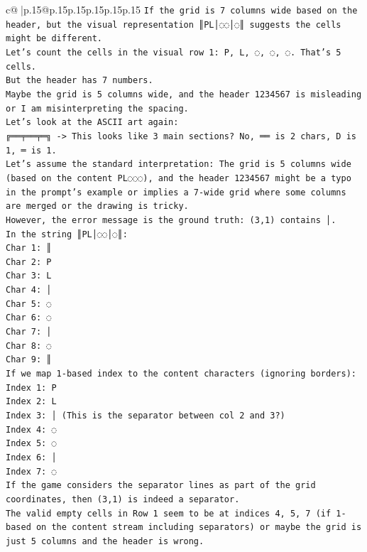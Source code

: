 \documentclass{article}
\begin{document}
{\begin{supertabular}{c@{$\;$}|p{.15\linewidth}@{}p{.15\linewidth}p{.15\linewidth}p{.15\linewidth}p{.15\linewidth}p{.15\linewidth}}
{{{\texttt{If the grid is 7 columns wide based on the header, but the visual representation ║PL│◌◌│◌║ suggests the cells might be different.} \\
\texttt{Let's count the cells in the visual row 1: P, L, ◌, ◌, ◌. That's 5 cells.} \\
\texttt{But the header has 7 numbers.} \\
\texttt{Maybe the grid is 5 columns wide, and the header 1234567 is misleading or I am misinterpreting the spacing.} \\
\texttt{Let's look at the ASCII art again:} \\
\texttt{╔══╤══╤═╗ {-}> This looks like 3 main sections? No, ══ is 2 chars, D is 1, ═ is 1.} \\
\texttt{Let's assume the standard interpretation: The grid is 5 columns wide (based on the content PL◌◌◌), and the header 1234567 might be a typo in the prompt's example or implies a 7{-}wide grid where some columns are merged or the drawing is tricky.} \\
\texttt{However, the error message is the ground truth: (3,1) contains │.} \\
\texttt{In the string ║PL│◌◌│◌║:} \\
\texttt{Char 1: ║} \\
\texttt{Char 2: P} \\
\texttt{Char 3: L} \\
\texttt{Char 4: │} \\
\texttt{Char 5: ◌} \\
\texttt{Char 6: ◌} \\
\texttt{Char 7: │} \\
\texttt{Char 8: ◌} \\
\texttt{Char 9: ║} \\
\texttt{If we map 1{-}based index to the content characters (ignoring borders):} \\
\texttt{Index 1: P} \\
\texttt{Index 2: L} \\
\texttt{Index 3: │ (This is the separator between col 2 and 3?)} \\
\texttt{Index 4: ◌} \\
\texttt{Index 5: ◌} \\
\texttt{Index 6: │} \\
\texttt{Index 7: ◌} \\
\texttt{If the game considers the separator lines as part of the grid coordinates, then (3,1) is indeed a separator.} \\
\texttt{The valid empty cells in Row 1 seem to be at indices 4, 5, 7 (if 1{-}based on the content stream including separators) or maybe the grid is just 5 columns and the header is wrong.} \\
}}}
\end{supertabular}}
\end{document}
